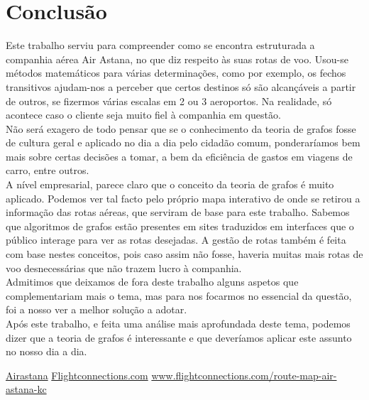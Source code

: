 \chapter{Conclusão}
Este trabalho serviu para compreender como se encontra estruturada a companhia aérea Air Astana, no que diz respeito às suas rotas de voo. Usou-se métodos matemáticos para várias determinações, como por exemplo, os fechos transitivos ajudam-nos a perceber que certos destinos só são alcançáveis a partir de outros, se fizermos várias escalas em 2 ou 3 aeroportos. Na realidade, só acontece caso o cliente seja muito fiel à companhia em questão.\\
\indent Não será exagero de todo pensar que se o conhecimento da teoria de grafos fosse de cultura geral e aplicado no dia a dia pelo cidadão comum, ponderaríamos bem mais sobre certas decisões a tomar, a bem da eficiência de gastos em viagens de carro, entre outros.\\
\indent A nível empresarial, parece claro que o conceito da teoria de grafos é muito aplicado. Podemos ver tal facto pelo próprio mapa interativo de onde se retirou a informação das rotas aéreas, que serviram de base para este trabalho. Sabemos que algoritmos de grafos estão presentes em sites traduzidos em interfaces que o público interage para ver as rotas desejadas. A gestão de rotas também é feita com base nestes conceitos, pois caso assim não fosse, haveria muitas mais rotas de voo desnecessárias que não trazem lucro à companhia.\\
\indent Admitimos que deixamos de fora deste trabalho alguns aspetos que complementariam mais o tema, mas para nos focarmos no essencial da questão, foi a nosso ver a melhor solução a adotar.\\
\indent Após este trabalho, e feita uma análise mais aprofundada deste tema, podemos dizer que a teoria de grafos é interessante e que deveríamos aplicar este assunto no nosso dia a dia.

\renewcommand\bibname{Referências}
\begin{thebibliography}{3}
    \href{https://airastana.com/global/en-us}{Airastana}
    \href{https://www.flightconnections.com/}{Flightconnections.com}
    \href{https://www.flightconnections.com/route-map-air-astana-kc}{www.flightconnections.com/route-map-air-astana-kc}
\end{thebibliography}
